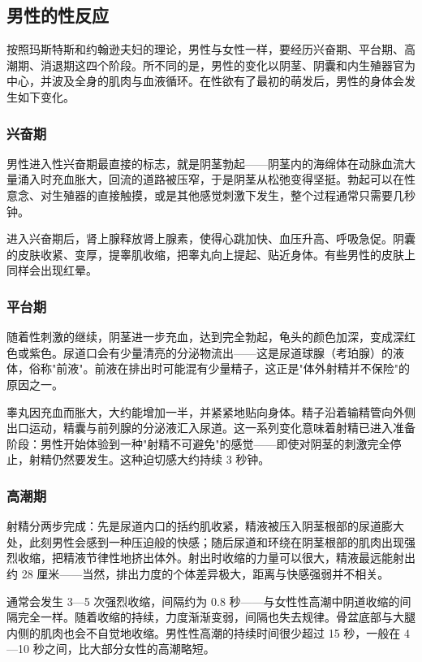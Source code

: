 \subsection{男性的性反应}

按照玛斯特斯和约翰逊夫妇的理论，男性与女性一样，要经历兴奋期、平台期、高潮期、消退期这四个阶段。所不同的是，男性的变化以阴茎、阴囊和内生殖器官为中心，并波及全身的肌肉与血液循环。在性欲有了最初的萌发后，男性的身体会发生如下变化。

\subsubsection{兴奋期}

男性进入性兴奋期最直接的标志，就是阴茎勃起——阴茎内的海绵体在动脉血流大量涌入时充血胀大，回流的道路被压窄，于是阴茎从松弛变得坚挺。勃起可以在性意念、对生殖器的直接触摸，或是其他感觉刺激下发生，整个过程通常只需要几秒钟。

进入兴奋期后，肾上腺释放肾上腺素，使得心跳加快、血压升高、呼吸急促。阴囊的皮肤收紧、变厚，提睾肌收缩，把睾丸向上提起、贴近身体。有些男性的皮肤上同样会出现红晕。

\subsubsection{平台期}

随着性刺激的继续，阴茎进一步充血，达到完全勃起，龟头的颜色加深，变成深红色或紫色。尿道口会有少量清亮的分泌物流出——这是尿道球腺（考珀腺）的液体，俗称"前液"。前液在排出时可能混有少量精子，这正是"体外射精并不保险"的原因之一。

睾丸因充血而胀大，大约能增加一半，并紧紧地贴向身体。精子沿着输精管向外侧出口运动，精囊与前列腺的分泌液汇入尿道。这一系列变化意味着射精已进入准备阶段：男性开始体验到一种"射精不可避免"的感觉——即使对阴茎的刺激完全停止，射精仍然要发生。这种迫切感大约持续 3 秒钟。

\subsubsection{高潮期}

射精分两步完成：先是尿道内口的括约肌收紧，精液被压入阴茎根部的尿道膨大处，此刻男性会感到一种压迫般的快感；随后尿道和环绕在阴茎根部的肌肉出现强烈收缩，把精液节律性地挤出体外。射出时收缩的力量可以很大，精液最远能射出约 28 厘米——当然，排出力度的个体差异极大，距离与快感强弱并不相关。

通常会发生 3—5 次强烈收缩，间隔约为 0.8 秒——与女性性高潮中阴道收缩的间隔完全一样。随着收缩的持续，力度渐渐变弱，间隔也失去规律。骨盆底部与大腿内侧的肌肉也会不自觉地收缩。男性性高潮的持续时间很少超过 15 秒，一般在 4—10 秒之间，比大部分女性的高潮略短。

